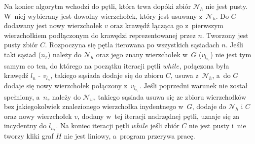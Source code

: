 \documentclass{article}
\begin{document}
Na koniec algorytm wchodzi do pętli, która trwa dopóki zbiór $\mathcal{N}_h$ nie jest pusty. W~niej wybierany jest dowolny wierzchołek, który jest usuwany z~$\mathcal{N}_h$. Do $G$ dodawany jest nowy wierzchołek $v$ oraz krawędź łącząca go z~pierwszym wierzchołkiem podłączonym do krawędzi reprezentowanej przez $n$. Tworzony jest pusty zbiór $C$. Rozpoczyna się pętla iterowana po wszystkich sąsiadach $n$. Jeśli taki sąsiad ($n_r$) należy do $\mathcal{N}_h$ oraz jego znany wierzchołek w~$G$ ($v_{l_{n_r}}$) nie jest tym samym co ten, do którego na początku iteracji pętli $while$, połączona była krawędź $l_{n}$ - $v_{l_{n}}$, takiego sąsiada dodaje się do zbioru $C$, usuwa z~$\mathcal{N}_h$, a~do $G$ dodaje się nowy wierzchołek połączony z~$v_{l_{n_r}}$. Jeśli poprzedni warunek nie został spełniony, a~$n_r$ należy do $\mathcal{N}_w$, takiego sąsiada usuwa się ze zbioru wierzchołków bez jakiegokolwiek znalezionego wierzchołka inydentnego w~$G$, dodaje do $\mathcal{N}_h$ i $C$ oraz nowy wierzchołek $v$, dodany w~tej iteracji nadrzędnej pętli, uznaje się za incydentny do $l_{n_r}$. Na koniec iteracji pętli $while$ jeśli zbiór $C$ nie jest pusty i~nie tworzy kliki graf $H$ nie jest liniowy, a~program przerywa pracę.




 

\end{document}
